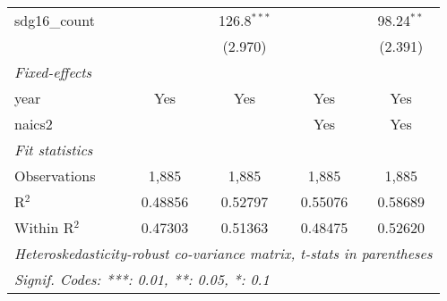 \begin{tabular}{lcccc}
   sdg16\_count      &                & 126.8$^{***}$  &                & 98.24$^{**}$\\   
                     &                & (2.970)        &                & (2.391)\\   
   \midrule
   \emph{Fixed-effects}\\
   year              & Yes            & Yes            & Yes            & Yes\\  
   naics2            &                &                & Yes            & Yes\\  
   \midrule
   \emph{Fit statistics}\\
   Observations      & 1,885          & 1,885          & 1,885          & 1,885\\  
   R$^2$             & 0.48856        & 0.52797        & 0.55076        & 0.58689\\  
   Within R$^2$      & 0.47303        & 0.51363        & 0.48475        & 0.52620\\  
   \midrule \midrule
   \multicolumn{5}{l}{\emph{Heteroskedasticity-robust co-variance matrix, t-stats in parentheses}}\\
   \multicolumn{5}{l}{\emph{Signif. Codes: ***: 0.01, **: 0.05, *: 0.1}}\\
\end{tabular}
\par\endgroup


